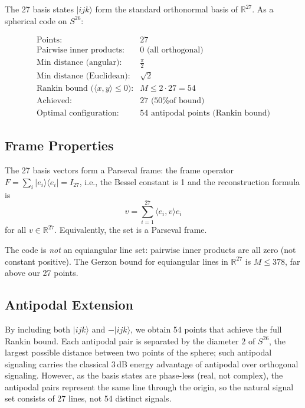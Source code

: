 \documentclass[12pt,a4paper]{article}
\begin{document}
The 27 basis states $|ijk\rangle$ form the standard orthonormal basis
of $\mathbb{R}^{27}$. As a spherical code on $S^{26}$:

\[
\begin{array}{ll}
\text{Points:} & 27 \\
\text{Pairwise inner products:} & 0 \text{ (all orthogonal)} \\
\text{Min distance (angular):} & \frac{\pi}{2} \\
\text{Min distance (Euclidean):} & \sqrt{2} \\
\text{Rankin bound ($\langle x,y \rangle \le 0$):} & M \le 2 \cdot 27 = 54 \\
\text{Achieved:} & 27 \text{ (50\% of bound)} \\
\text{Optimal configuration:} & 54 \text{ antipodal points (Rankin bound)}
\end{array}
\]

\subsection{Frame Properties}

The 27 basis vectors form a Parseval frame: the frame operator
$F = \sum_i |e_i\rangle\langle e_i| = I_{27}$, i.e., the Bessel constant
is 1 and the reconstruction formula is
\[
v = \sum_{i=1}^{27} \langle e_i, v \rangle e_i
\]
for all $v \in \mathbb{R}^{27}$. Equivalently, the set is a Parseval
frame.

The code is \emph{not} an equiangular line set: pairwise inner products
are all zero (not constant positive). The Gerzon bound for equiangular
lines in $\mathbb{R}^{27}$ is $M \le 378$, far above our 27 points.

\subsection{Antipodal Extension}

By including both $|ijk\rangle$ and $-|ijk\rangle$, we obtain 54 points
that achieve the full Rankin bound. Each antipodal pair is separated by
the diameter $2$ of $S^{26}$, the largest possible distance between two
points of the sphere; such antipodal signaling carries the classical
$3$\,dB energy advantage of antipodal over orthogonal signaling. However, as the basis states are phase-less
(real, not complex), the antipodal pairs represent the same line through
the origin, so the natural signal set consists of 27 lines, not 54
distinct signals.
\end{document}
